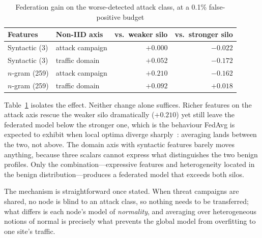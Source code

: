\documentclass[conference]{IEEEtran}
\begin{document}
\begin{table}[htbp]
\centering
\caption{Federation gain on the worse-detected attack class, at a 0.1\% false-positive budget}
\label{tab:matrix}
\begin{tabular}{@{}llrr@{}}
\toprule
\textbf{Features} & \textbf{Non-IID axis} & \textbf{vs.\ weaker silo} & \textbf{vs.\ stronger silo} \\ \midrule
Syntactic (3)   & attack campaign & $+0.000$ & $-0.022$ \\
Syntactic (3)   & traffic domain  & $+0.052$ & $-0.172$ \\
$n$-gram (259)  & attack campaign & $+0.210$ & $-0.162$ \\
$n$-gram (259)  & traffic domain  & $+0.092$ & $\mathbf{+0.018}$ \\ \bottomrule
\end{tabular}
\end{table}

Table~\ref{tab:matrix} isolates the effect. Neither change alone suffices. Richer features on the attack axis rescue the weaker silo dramatically ($+0.210$) yet still leave the federated model below the stronger one, which is the behaviour FedAvg is expected to exhibit when local optima diverge sharply~\cite{li2020convergence}: averaging lands between the two, not above. The domain axis with syntactic features barely moves anything, because three scalars cannot express what distinguishes the two benign profiles. Only the combination---expressive features and heterogeneity located in the benign distribution---produces a federated model that exceeds both silos.

The mechanism is straightforward once stated. When threat campaigns are shared, no node is blind to an attack class, so nothing needs to be transferred; what differs is each node's model of \emph{normality}, and averaging over heterogeneous notions of normal is precisely what prevents the global model from overfitting to one site's traffic.
\end{document}
